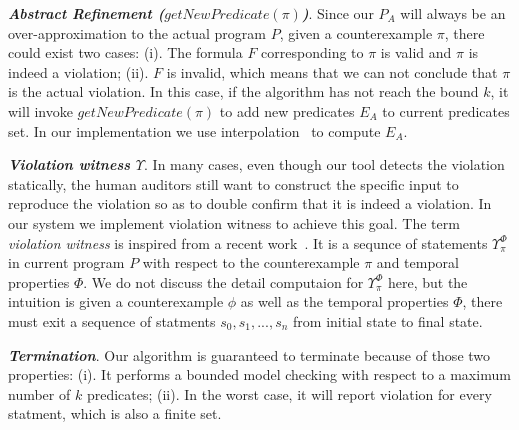 \documentclass{article}
\begin{document}
{\bf \emph{Abstract Refinement ($getNewPredicate(\pi)$)}}. Since our $P_A$ will always be
 an over-approximation to the actual program $P$, given a counterexample $\pi$,  there could 
exist two cases: (i). The formula $F$ corresponding to $\pi$ is valid and $\pi$ is indeed a 
violation; (ii). $F$ is invalid, which means that we can not conclude that $\pi$ is the actual 
violation. In this case, if the algorithm has not reach the bound $k$, it will invoke 
$getNewPredicate(\pi)$ to add new predicates $E_A$ to current predicates set. In our implementation we use interpolation~\cite{mcmillan05} to compute $E_A$.

{\bf \emph{Violation witness $\Upsilon$}}. 
In many cases, even though our tool detects the violation statically, the human auditors 
still want to construct the specific input to reproduce the violation so as to double confirm
that it is indeed a violation. In our system we implement violation witness to achieve this
goal. The term \emph{violation witness} is inspired from a recent work~\cite{cegar12}. 
It is a sequnce of statements $\Upsilon^{\Phi}_{\pi}$ in current program $P$ with respect to the counterexample $\pi$ and temporal properties $\Phi$. We do not discuss the detail computaion for  
$\Upsilon^{\Phi}_{\pi}$ here, but the intuition is given a counterexample $\phi$ as well as
the temporal properties $\Phi$, there must exit a sequence of statments $s_0, s_1, ..., s_n$
from initial state to final state.

{\bf \emph{Termination}}. 
Our algorithm is guaranteed to terminate because of those two properties: (i). It performs a
 bounded model checking with respect to a maximum number of $k$ predicates; (ii). In the worst
 case, it will report violation for every statment, which is also a finite set.
\end{document}
